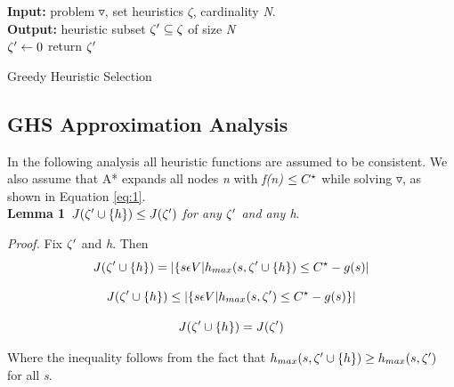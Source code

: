 \documentclass[11pt,a4paper,oneside]{report}
\begin{document}
\begin{algorithm}[H]
\textbf{Input:} problem $\triangledown$, set heuristics $\zeta
$, cardinality \textit{N}.\\
\textbf{Output:} heuristic subset $\zeta\sp{\prime} \subseteq \zeta$ of size \textit{N}\\
\SetAlgoLined
 $\zeta\sp{\prime} \leftarrow 0$\;
 return $\zeta\sp{\prime}$
 \caption{Greedy Heuristic Selection}
\end{algorithm}

\subsection{GHS Approximation Analysis}
In the following analysis all heuristic functions are assumed to be consistent. We also assume that A* expands all nodes \textit{n} with \textit{f(n) $\leq C\sp{\star}$} while solving $\triangledown$, as shown in Equation \ref{eq:1}.\\

\textbf{Lemma 1}\ $J(\zeta\sp{\prime} \cup \{h\}) \leq J(\zeta\sp{\prime})$ 
\textit{for any $\zeta\sp{\prime}$ and any h}.

\textit{Proof.} Fix $\zeta\sp{\prime}$ and \textit{h}. Then\\

\begin{equation}
\label{eq:5}
J(\zeta\sp{\prime} \cup \{h\}) = |\{s \epsilon V| h_{\substack{max}}(s, \zeta\sp{\prime} \cup \{h\}) \leq C\sp{\star} - g(s)|
\end{equation}

\begin{equation}
\label{eq:6}
J(\zeta\sp{\prime} \cup \{h\}) \leq |\{s \epsilon V| h_{\substack{max}}(s, \zeta\sp{\prime}) \leq C\sp{\star} - g(s) \}|
\end{equation}

\begin{equation}
\label{eq:7}
J(\zeta\sp{\prime} \cup \{h\}) = J(\zeta\sp{\prime})
\end{equation}

Where the inequality follows from the fact that $h_{\substack{max}}(s, \zeta\sp{\prime} \cup \{h\}) \geq  h_{\substack{max}}(s, \zeta\sp{\prime})$  for all \textit{s}.\\
\end{document}
